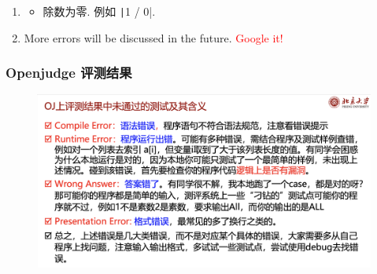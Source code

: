\documentclass[handout]{ctexbeamer}
\begin{document}
\begin{frame}
\begin{enumerate}
\begin{itemize}
            \end{itemize}
            \item<5-> 
            \begin{itemize}
                \item 除数为零. 例如 \texttt|1 / 0|.
            \end{itemize}
            \item<6-> More errors will be discussed in the future. \textcolor{red}{Google it!}
        \end{enumerate}
    \end{frame}

        \begin{frame}
            \frametitle{Openjudge 评测结果}
            \begin{figure}
                \centering
                \includegraphics[width=1\textwidth]{./images/openjudge.png}
            \end{figure}
        \end{frame}
\end{document}
